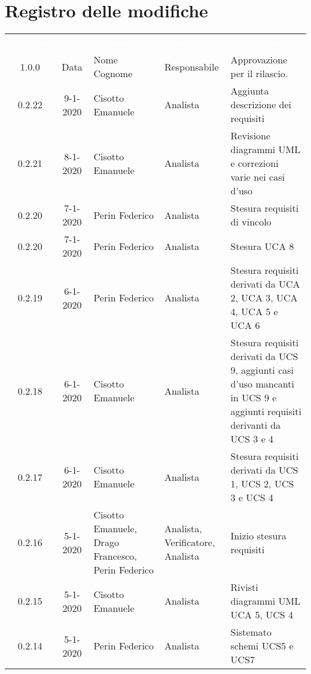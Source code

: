 \section*{Registro delle modifiche}
{
\renewcommand{\arraystretch}{1.5}
\centering
\begin{longtable}{ c c  C{4cm}  C{3cm} C{4cm}}
\textcolor{white}{\textbf{Versione}} & \textcolor{white}{\textbf{Data}} & \textcolor{white}{\textbf{Nominativo}} & \textcolor{white}{\textbf{Ruolo}} & \textcolor{white}{\textbf{Descrizione}}\\	


1.0.0 & Data & Nome Cognome & Responsabile & Approvazione per il rilascio.  \\

0.2.22 & 9-1-2020 & Cisotto Emanuele & Analista & Aggiunta descrizione dei requisiti \\

0.2.21 & 8-1-2020 & Cisotto Emanuele & Analista & Revisione diagrammi UML e correzioni varie nei casi d'uso \\

0.2.20 & 7-1-2020 & Perin Federico & Analista & Stesura requisiti di vincolo\\

0.2.20 & 7-1-2020 & Perin Federico & Analista & Stesura UCA 8\\

0.2.19 & 6-1-2020 & Perin Federico & Analista & Stesura requisiti derivati da UCA 2, UCA 3, UCA 4, UCA 5 e UCA 6\\

0.2.18 & 6-1-2020 & Cisotto Emanuele & Analista & Stesura requisiti derivati da UCS 9, aggiunti casi d'uso mancanti in UCS 9 e aggiunti requisiti derivanti da UCS 3 e 4 \\

0.2.17 & 6-1-2020 & Cisotto Emanuele & Analista & Stesura requisiti derivati da UCS 1, UCS 2, UCS 3 e UCS 4 \\

0.2.16 & 5-1-2020 & Cisotto Emanuele, Drago Francesco, Perin Federico & Analista, Verificatore, Analista & Inizio stesura requisiti \\

0.2.15 & 5-1-2020 & Cisotto Emanuele & Analista & Rivisti diagrammi UML UCA 5, UCS 4 \\

0.2.14 & 5-1-2020 & Perin Federico & Analista & Sistemato schemi UCS5 e UCS7 \\


\end{longtable}}
